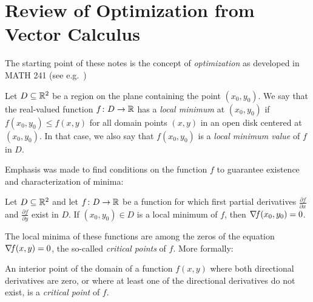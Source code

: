 
\chapter{Review of Optimization from Vector Calculus}\label{chapter:intro}

The starting point of these notes is the concept of \emph{optimization} as developed in MATH 241 (see e.g.~\cite[Chapter~14]{finney2001thomas})

\begin{definition}\label{def:localminimum}
Let $D\subseteq \mathbb{R}^2$ be a region on the plane containing the point $(x_0, y_0)$.  We say that the real-valued function $f\colon D \to \mathbb{R}$ has a \emph{local minimum} at $(x_0,y_0)$ if $f(x_0,y_0) \leq f(x,y)$ for all domain points $(x,y)$ in an open disk centered at $(x_0,y_0)$.  In that case, we also say that $f(x_0,y_0)$ is a \emph{local minimum value} of $f$ in $D$.
\end{definition}

Emphasis was made to find conditions on the function $f$ to guarantee existence and characterization of minima:

\begin{theorem}\label{theorem:localminimum}
Let $D \subseteq \mathbb{R}^2$ and let $f \colon D \to \mathbb{R}$ be a function for which first partial derivatives $\frac{\partial f}{\partial x}$ and $\frac{\partial f}{\partial y}$ exist in $D$.  If $(x_0,y_0) \in D$ is a local minimum of $f$, then $\mathop{\nabla\! {f}}(x_0,y_0)=0$.
\end{theorem}

The local minima of these functions are among the zeros of the equation $\mathop{\nabla\! {f}}(x,y)=0$, the so-called \emph{critical points} of $f$. More formally:

\begin{definition}\label{def:criticalpoint}
An interior point of the domain of a function $f(x,y)$ where both directional derivatives are zero, or where at least one of the directional derivatives do not exist, is a \emph{critical point} of $f$.
\end{definition}

